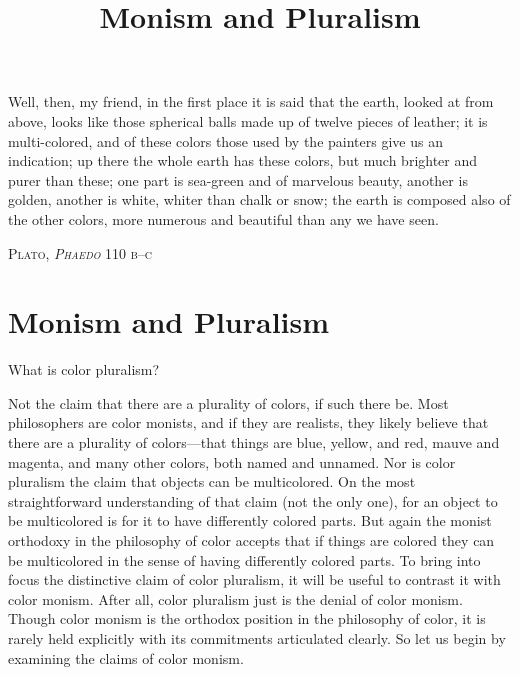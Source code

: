 \documentclass[12pt]{article}
\title{Monism and Pluralism}
\author{\myauthor}
\date{} %
\begin{document}
\maketitle
\epigraph{Well, then, my friend, in the first place it is said that the earth, looked at from above, looks like those spherical balls made up of twelve pieces of leather; it is multi-colored, and of these colors those used by the painters give us an indication; up there the whole earth has these colors, but much brighter and purer than these; one part is sea-green and of marvelous beauty, another is golden, another is white, whiter than chalk or snow; the earth is composed also of the other colors, more numerous and beautiful than any we have seen.}{\textsc{Plato, \emph{Phaedo} 110 b--c}} %

\setlength{\parindent}{1em}


\section{Monism and Pluralism} %
\label{sec:monism_and_pluralism}

What is color pluralism? 

Not the claim that there are a plurality of colors, if such there be. Most philosophers are color monists, and if they are realists, they likely believe that there are a plurality of colors---that things are blue, yellow, and red, mauve and magenta, and many other colors, both named and unnamed. Nor is color pluralism the claim that objects can be multicolored. On the most straightforward understanding of that claim (not the only one), for an object to be multicolored is for it to have differently colored parts. But again the monist orthodoxy in the philosophy of color accepts that if things are colored they can be multicolored in the sense of having differently colored parts. To bring into focus the distinctive claim of color pluralism, it will be useful to contrast it with color monism. After all, color pluralism just is the denial of color monism. Though color monism is the orthodox position in the philosophy of color, it is rarely held explicitly with its commitments articulated clearly. So let us begin by examining the claims of color monism.
\end{document}
